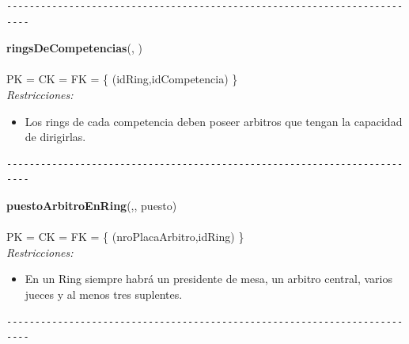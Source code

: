 \begin{verbatim}
--------------------------------------------------------------------------
\end{verbatim}

\noindent\textbf{ringsDeCompetencias}(, )
\\
\\
PK = CK = FK = \{ (idRing,idCompetencia) \} \\

\textit{Restricciones:}
\begin{itemize}
	\item Los rings de cada competencia deben poseer arbitros que tengan la capacidad de dirigirlas.
\end{itemize}

\begin{verbatim}
--------------------------------------------------------------------------
\end{verbatim}

\noindent\textbf{puestoArbitroEnRing}(,, puesto)
\\
\\
PK = CK = FK = \{ (nroPlacaArbitro,idRing) \} \\

\textit{Restricciones:}
\begin{itemize}
	\item En un Ring siempre habrá un presidente de mesa, un arbitro central, varios jueces y al menos tres suplentes.
\end{itemize}

\begin{verbatim}
--------------------------------------------------------------------------
\end{verbatim}